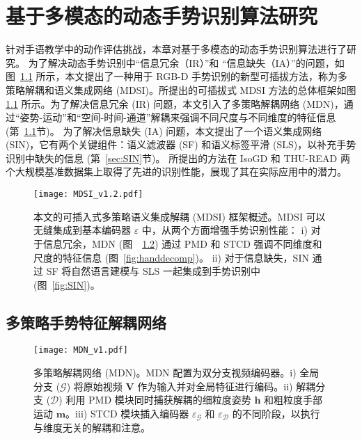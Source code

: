 
\chapter{基于多模态的动态手势识别算法研究}
\label{sec:GR}
针对手语教学中的动作评估挑战，本章对基于多模态的动态手势识别算法进行了研究。
为了解决动态手势识别中“信息冗余（IR）”和 “信息缺失（IA）”的问题，如图~\ref{fig:MDSI} 所示，本文提出了一种用于 RGB-D 手势识别的新型可插拔方法，称为多策略解耦和语义集成网络 (MDSI)。所提出的可插拔式 MDSI 方法的总体框架如图 \ref{fig:MDSI} 所示。为了解决信息冗余 (IR) 问题，本文引入了多策略解耦网络 (MDN)，通过“姿势-运动”和“空间-时间-通道”解耦来强调不同尺度与不同维度的特征信息 (第~\ref{sec:MDN}节)。
为了解决信息缺失 (IA) 问题，本文提出了一个语义集成网络 (SIN)，它有两个关键组件：语义滤波器 (SF) 和语义标签平滑 (SLS)，以补充手势识别中缺失的信息 (第~\ref{sec:SIN}节)。
所提出的方法在 IsoGD 和 THU-READ 两个大规模基准数据集上取得了先进的识别性能，展现了其在实际应用中的潜力。
\begin{figure}[tb]
  \centering
  \texttt{[image: MDSI\_v1.2.pdf]}%
  \caption{本文的可插入式多策略语义集成解耦 (MDSI) 框架概述。MDSI 可以无缝集成到基本编码器 $\varepsilon$ 中，从两个方面增强手势识别性能：
  i) 对于信息冗余，MDN (图~~\ref{fig:MDN}) 通过 PMD 和 STCD 强调不同维度和尺度的特征信息 (图~\ref{fig:handdecomp})。
  ii) 对于信息缺失，SIN 通过 SF 将自然语言建模与 SLS 一起集成到手势识别中 (图~\ref{fig:SIN})。}
  \label{fig:MDSI}
\end{figure}

\section{多策略手势特征解耦网络}
\label{sec:MDN}
\begin{figure}[tb]
  \centering
  \texttt{[image: MDN\_v1.pdf]}
    \caption{多策略解耦网络 (MDN)。MDN 配置为双分支视频编码器。i) 全局分支 ($\mathcal{G}$) 将原始视频 $\mathbf{V}$ 作为输入并对全局特征进行编码。ii) 解耦分支 ($\mathcal{D}$) 利用 PMD 模块同时捕获解耦的细粒度姿势 $\mathbf{h}$ 和粗粒度手部运动 $\mathbf{m}$。iii) STCD 模块插入编码器 $\varepsilon_{\mathcal{G}}$ 和 $\varepsilon_{\mathcal{D}}$ 的不同阶段，以执行与维度无关的解耦和注意。}
  \label{fig:MDN}
\end{figure}

